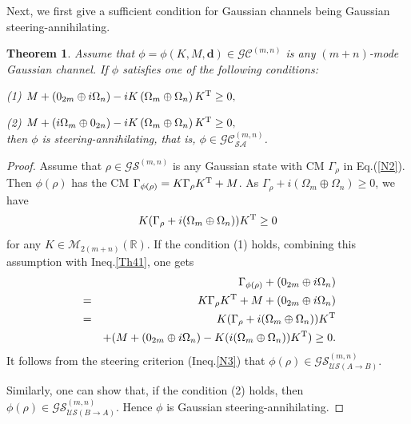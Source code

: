 \documentclass[10pt,aps,pra,amsfonts,amssymb,amsmath,%
floatfix,nofootinbib, groupedaddress,superscriptaddress,citesort,twocolumn
]{revtex4}%
\newtheorem{theorem}{Theorem}
\begin{document}
Next, we first give a sufficient condition for  Gaussian channels being Gaussian steering-annihilating. 

\begin{theorem}  \label{TH3}  Assume that $\phi =\phi\left( {K,M,\mathbf d} \right) \in {\mathcal {GC}}^{(m,n)}$ is any $(m+n)$-mode Gaussian channel. If $\phi$ satisfies one of the following conditions: 
		
 {\rm (1)}	 $M + ({0_{2m}} \oplus i{\Omega _n}) - iK\left( \Omega _m \oplus \Omega _n \right){K^{\rm T}} \ge 0,$
 
{\rm (2)} $M + ( i{\Omega _m} \oplus{0_{2n}}) - iK\left( \Omega _m \oplus \Omega _n \right){K^{\rm T}} \ge 0,$\\
then $\phi $ is steering-annihilating,  that is,
$\phi \in  {\mathcal {GC}}^{(m,n)}_{\mathcal {SA}}$.
\end{theorem}		


\begin{proof}
	Assume that  $\rho  \in {\mathcal {GS}}^{(m,n)} $ is any Gaussian state  with CM $\Gamma_{\rho} $ in Eq.(\ref{N2}).  Then
	$\phi(\rho) $ has the CM $\Gamma_{\phi(\rho)} = K\Gamma_\rho {K^{\rm T}} + M$.
	 As
	$\Gamma_{\rho}  + i( \Omega_m \oplus \Omega_n ) \ge 0$,   we have  
	\begin{equation}\label{Th41}
			K(\Gamma_{\rho}+i( \Omega_m \oplus \Omega_n ))K^{\rm T} \ge 0 \end{equation} 
			for any $ K \in \mathcal M_{2(m+n)}(\mathbb R)$.  If  the condition (1) holds, combining  this assumption  with Ineq.\eqref{Th41},  one gets
\begin{eqnarray*}
& &\Gamma _{\phi ( \rho )} + ( 0_{2m} \oplus i{\Omega _n})\\
&=& K\Gamma_{\rho} {K^{\rm T}} + M + ( 0_{2m} \oplus i{\Omega _n} )\\
 &=& K(\Gamma_{\rho}+i( \Omega_m \oplus \Omega_n ))K^{\rm T}\\
& &+( M + ( 0_{2m} \oplus i\Omega_n)-K(i( \Omega_m \oplus \Omega_n ))K^{\rm T})\ge   0.
\end{eqnarray*}
It follows from  the steering criterion (Ineq.\eqref{N3})  that $\phi \left( \rho \right) \in \mathcal  {GS}^{(m,n)}_{\mathcal {US}(A \rightarrow  B)}$.

Similarly, one can show that, if the condition (2) holds, then  $\phi \left( \rho \right) \in \mathcal  {GS}^{(m,n)}_{\mathcal {US}(B \rightarrow  A)}$.
Hence $ \phi $ is Gaussian steering-annihilating.
\end{proof}	
\end{document}
